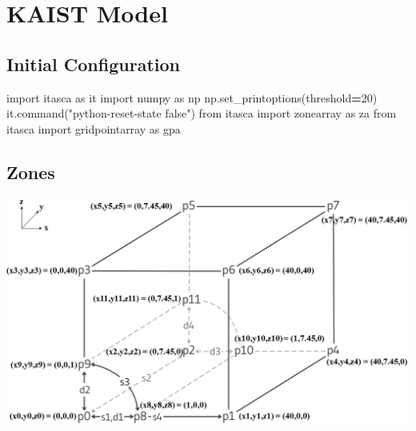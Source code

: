 \documentclass[a4paper, nobind]{templates/ociamthesis}
\newenvironment{Shaded}{\begin{snugshade}}{\end{snugshade}}
\newcommand{\DecValTok}[1]{\textcolor[rgb]{0.00,0.00,0.81}{#1}}
\newcommand{\ImportTok}[1]{#1}
\newcommand{\NormalTok}[1]{#1}
\newcommand{\OperatorTok}[1]{\textcolor[rgb]{0.81,0.36,0.00}{\textbf{#1}}}
\newcommand{\StringTok}[1]{\textcolor[rgb]{0.31,0.60,0.02}{#1}}
\renewenvironment{Shaded}
{
  \vspace{10pt}%
  \begin{snugshade}%
}{%
  \end{snugshade}%
  \vspace{8pt}%
}
\begin{document}
\hypertarget{kaist-model}{%
\chapter{KAIST Model}\label{kaist-model}}

\hypertarget{initial-configuration}{%
\section{Initial Configuration}\label{initial-configuration}}

\begin{Shaded}
\begin{Highlighting}[]
\ImportTok{import}\NormalTok{ itasca }\ImportTok{as}\NormalTok{ it}
\ImportTok{import}\NormalTok{ numpy }\ImportTok{as}\NormalTok{ np}
\NormalTok{np.set\_printoptions(threshold}\OperatorTok{=}\DecValTok{20}\NormalTok{)}
\NormalTok{it.command(}\StringTok{"python{-}reset{-}state false"}\NormalTok{)}
\ImportTok{from}\NormalTok{ itasca }\ImportTok{import}\NormalTok{ zonearray }\ImportTok{as}\NormalTok{ za}
\ImportTok{from}\NormalTok{ itasca }\ImportTok{import}\NormalTok{ gridpointarray }\ImportTok{as}\NormalTok{ gpa}
\end{Highlighting}
\end{Shaded}

\hypertarget{zones}{%
\section{Zones}\label{zones}}

\includegraphics[width=1\linewidth]{myfigureeeeee/final-block}
\end{document}
